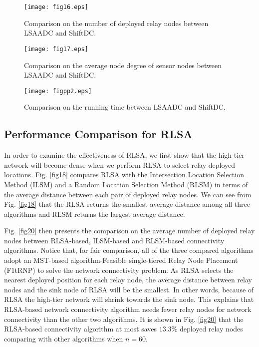 \documentclass[journal]{IEEEtran}
\begin{document}
\begin{figure}
\begin{center}
\texttt{[image: fig16.eps]}    \caption{Comparison on the number of deployed relay nodes between LSAADC and ShiftDC.}
\label{fig16}                                 \end{center}                                 \end{figure}

\begin{figure}
\begin{center}
\texttt{[image: fig17.eps]}    \caption{Comparison on the average node degree of sensor nodes between LSAADC and ShiftDC.}
\label{fig17}                                 \end{center}                                 \end{figure}

 \begin{figure}
\begin{center}
\texttt{[image: figpp2.eps]}    \caption{Comparison on the running time between LSAADC and ShiftDC.}
\label{figpp2}                                 \end{center}                                 \end{figure}

\subsection{Performance Comparison for RLSA}
In order to examine the effectiveness of RLSA, we first show that the high-tier network will become dense when we perform RLSA to select relay deployed locations. Fig. \ref{fig18} compares RLSA with the Intersection Location Selection Method (ILSM) \cite{Tang06} \cite{Ali11} and a Random Location Selection Method (RLSM) in terms of the average distance between each pair of deployed relay nodes. We can see from Fig. \ref{fig18} that the RLSA returns the smallest average distance among all three algorithms and RLSM returns the largest average distance.

Fig. \ref{fig20} then presents the comparison on the average number of deployed relay nodes between RLSA-based, ILSM-based and RLSM-based connectivity algorithms. Notice that, for fair comparison, all of the three compared algorithms adopt an MST-based algorithm-Feasible single-tiered Relay Node Placement (F1tRNP) \cite{Lloyd07} to solve the network connectivity problem. As RLSA selects the nearest deployed position for each relay node, the average distance between relay nodes and the sink node of RLSA will be the smallest. In other words, because of RLSA the high-tier network will shrink towards the sink node. This explains that RLSA-based network connectivity algorithm needs fewer relay nodes for network connectivity than the other two algorithms. It is shown in Fig. \ref{fig20} that the RLSA-based connectivity algorithm at most saves $13.3\%$ deployed relay nodes comparing with other algorithms when $n=60$.
\end{document}

